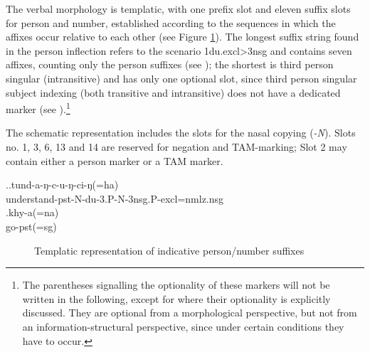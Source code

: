 The verbal morphology is  templatic, with one prefix slot and eleven suffix slots for person and number, established according to the sequences in which the affixes occur relative to each other (see Figure \ref{agr-list}). The longest suffix string found in the person inflection refers to the scenario {\sc 1du.excl>3nsg} and contains seven affixes,  counting only the person suffixes (see \Next[a]); the shortest is third person singular (intransitive) and has only one optional slot, since third person singular subject indexing (both transitive and intransitive) does not have a dedicated marker (see \Next[b]).\footnote{The parentheses signalling the optionality of these markers will not be written in the following, except for where their optionality is explicitly discussed. They are optional from a morphological perspective, but not from an information-structural perspective, since under certain conditions they have to occur.}

The schematic representation includes the slots for the nasal copying (\emph{-N}). Slots no. 1, 3, 6,  13 and 14 are reserved for negation and TAM-marking; Slot 2 may contain either a person marker or a TAM marker. 

\ex.\ag.tund-a-ŋ-c-u-ŋ-ci-ŋ(=ha)\\
understand{\sc -pst-N-du-3.P-N-3nsg.P-excl=nmlz.nsg}\\
\bg.khy-a(=na)\\
go{\sc -pst(=sg)}\\

\begin{figure}[htp]
{\small
{}
}
\caption{Templatic representation of indicative person/number suffixes}\label{agr-list}
\end{figure} 



